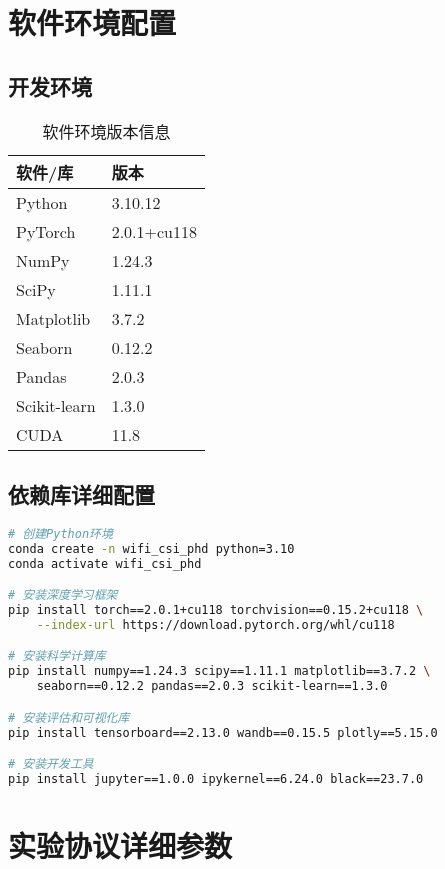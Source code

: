\section{软件环境配置}
\label{app:software_config}

\subsection{开发环境}
\label{app:dev_environment}

\begin{table}[h]
\centering
\caption{软件环境版本信息}
\label{tab:software_versions}
\begin{tabular}{ll}
\toprule
\textbf{软件/库} & \textbf{版本} \\
\midrule
Python & 3.10.12 \\
PyTorch & 2.0.1+cu118 \\
NumPy & 1.24.3 \\
SciPy & 1.11.1 \\
Matplotlib & 3.7.2 \\
Seaborn & 0.12.2 \\
Pandas & 2.0.3 \\
Scikit-learn & 1.3.0 \\
CUDA & 11.8 \\
\bottomrule
\end{tabular}
\end{table}

\subsection{依赖库详细配置}
\label{app:dependencies}

\begin{lstlisting}[language=bash, caption=环境配置脚本]
# 创建Python环境
conda create -n wifi_csi_phd python=3.10
conda activate wifi_csi_phd

# 安装深度学习框架
pip install torch==2.0.1+cu118 torchvision==0.15.2+cu118 \
    --index-url https://download.pytorch.org/whl/cu118

# 安装科学计算库
pip install numpy==1.24.3 scipy==1.11.1 matplotlib==3.7.2 \
    seaborn==0.12.2 pandas==2.0.3 scikit-learn==1.3.0

# 安装评估和可视化库
pip install tensorboard==2.13.0 wandb==0.15.5 plotly==5.15.0

# 安装开发工具
pip install jupyter==1.0.0 ipykernel==6.24.0 black==23.7.0
\end{lstlisting}

\section{实验协议详细参数}
\label{app:protocol_details}


